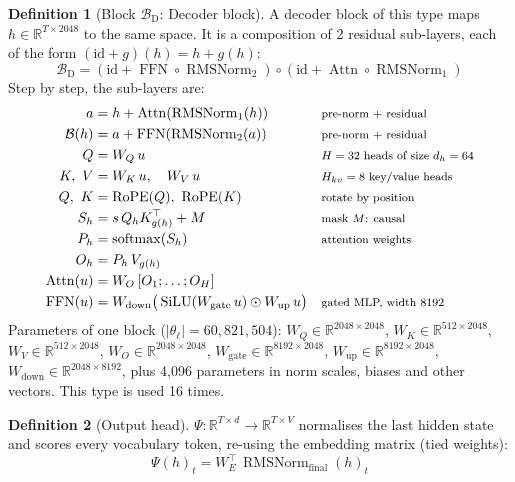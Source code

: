 \documentclass[10pt,a4paper]{article}
\newcommand{\op}[1]{\operatorname{#1}}
\theoremstyle{definition}
\newtheorem{definition}{Definition}[section]
\begin{document}
\begin{definition}[Block $\mathcal{B}_{\mathrm{D}}$: Decoder block]
A decoder block of this type maps $h\in\mathbb{R}^{T\times 2048}$ to the same space. It is a composition of 2 residual sub-layers, each of the form $(\mathrm{id}+g)(h)=h+g(h)$:
\begin{equation}
  \mathcal{B}_{\mathrm{D}} = (\mathrm{id}+\op{FFN}\circ \op{RMSNorm}_{2})\circ(\mathrm{id}+\op{Attn}\circ \op{RMSNorm}_{1})
\end{equation}
Step by step, the sub-layers are:
\begin{align*}
  a &= h + \op{Attn}(\op{RMSNorm}_{1}(h)) && \text{\footnotesize pre-norm + residual} \\
  \mathcal{B}(h) &= a + \op{FFN}(\op{RMSNorm}_{2}(a)) && \text{\footnotesize pre-norm + residual} \\
  Q &= W_Q\,u && \text{\footnotesize $H=32$ heads of size $d_h=64$} \\
  K,\ V &= W_K\,u,\quad W_V\,u && \text{\footnotesize $H_{kv}=8$ key/value heads} \\
  Q,\ K &= \op{RoPE}(Q),\ \op{RoPE}(K) && \text{\footnotesize rotate by position} \\
  S_h &= s\, Q_h K_{g(h)}^{\top} + M && \text{\footnotesize mask $M$: causal} \\
  P_h &= \op{softmax}(S_h) && \text{\footnotesize attention weights} \\
  O_h &= P_h\, V_{g(h)} \\
  \op{Attn}(u) &= W_O\,[O_1;\dots;O_H] \\
  \op{FFN}(u) &= W_{\mathrm{down}}\big(\op{SiLU}(W_{\mathrm{gate}}\,u)\odot W_{\mathrm{up}}\,u\big) && \text{\footnotesize gated MLP, width 8192}
\end{align*}
Parameters of one block ($|\theta_\ell|=60{,}821{,}504$): $W_Q\in\mathbb{R}^{2048\times2048}$, $W_K\in\mathbb{R}^{512\times2048}$, $W_V\in\mathbb{R}^{512\times2048}$, $W_O\in\mathbb{R}^{2048\times2048}$, $W_{\mathrm{gate}}\in\mathbb{R}^{8192\times2048}$, $W_{\mathrm{up}}\in\mathbb{R}^{8192\times2048}$, $W_{\mathrm{down}}\in\mathbb{R}^{2048\times8192}$, plus 4,096 parameters in norm scales, biases and other vectors. This type is used 16 times.
\end{definition}
\begin{definition}[Output head]
$\Psi:\mathbb{R}^{T\times d}\to\mathbb{R}^{T\times V}$ normalises the last hidden state and scores every vocabulary token, re-using the embedding matrix (tied weights):
\begin{equation}
  \Psi(h)_t = W_E^{\top}\,\op{RMSNorm}_{\mathrm{final}}(h)_t
\end{equation}
\end{definition}
\end{document}
